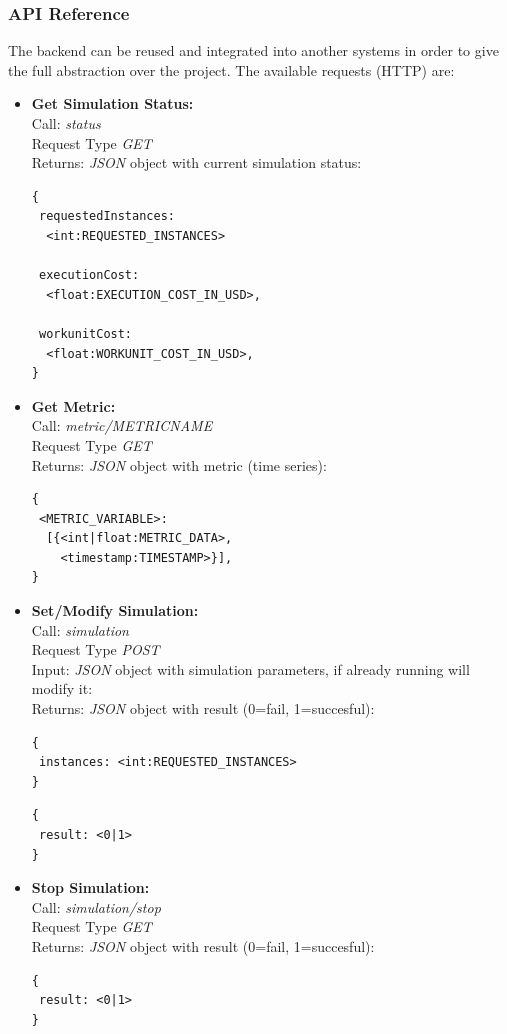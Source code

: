 \documentclass[journal abbreviation, manuscript]{copernicus}
\begin{document}
\subsubsection{API Reference}
The backend can be reused and integrated into another systems in order to give the full abstraction over the project. The available requests (HTTP) are:

\begin{itemize}
 \item \textbf{Get Simulation Status:}\\
 Call: \textit{status}\\
 Request Type \textit{GET}\\
 Returns: \textit{JSON} object with current simulation status:
\begin{verbatim}
{
 requestedInstances:
  <int:REQUESTED_INSTANCES>

 executionCost:
  <float:EXECUTION_COST_IN_USD>,

 workunitCost:
  <float:WORKUNIT_COST_IN_USD>,
}
\end{verbatim}


 \item \textbf{Get Metric:}\\
 Call: \textit{metric/METRICNAME}\\
 Request Type \textit{GET}\\
 Returns: \textit{JSON} object with metric (time series):
\begin{verbatim}
{
 <METRIC_VARIABLE>:
  [{<int|float:METRIC_DATA>,
    <timestamp:TIMESTAMP>}],
}
\end{verbatim}

 \item \textbf{Set/Modify Simulation:}\\
 Call: \textit{simulation}\\
 Request Type \textit{POST}\\
 Input: \textit{JSON} object with simulation parameters, if already running will modify it:\\
 Returns: \textit{JSON} object with result (0=fail, 1=succesful):
\begin{verbatim}
{
 instances: <int:REQUESTED_INSTANCES>
}
\end{verbatim}

\begin{verbatim}
{
 result: <0|1>
}
\end{verbatim}

 \item \textbf{Stop Simulation:}\\
 Call: \textit{simulation/stop}\\
 Request Type \textit{GET}\\
 Returns: \textit{JSON} object with result (0=fail, 1=succesful):
\begin{verbatim}
{
 result: <0|1>
}
\end{verbatim}
\end{itemize}
\end{document}
